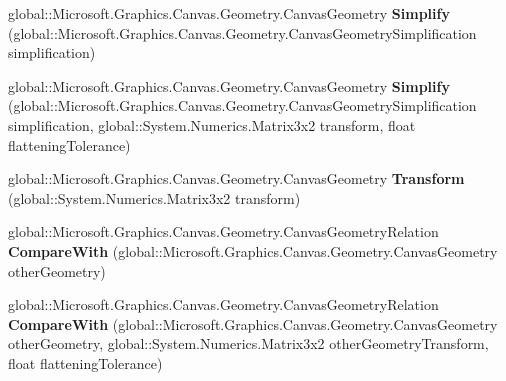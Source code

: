 \begin{DoxyCompactItemize}
global\+::\+Microsoft.\+Graphics.\+Canvas.\+Geometry.\+Canvas\+Geometry {\bfseries Simplify} (global\+::\+Microsoft.\+Graphics.\+Canvas.\+Geometry.\+Canvas\+Geometry\+Simplification simplification)
\item 
\mbox{\label{interface_microsoft_1_1_graphics_1_1_canvas_1_1_geometry_1_1_i_canvas_geometry_a4b3fad1c94d6807ac4628caa31ddcdfa}} 
global\+::\+Microsoft.\+Graphics.\+Canvas.\+Geometry.\+Canvas\+Geometry {\bfseries Simplify} (global\+::\+Microsoft.\+Graphics.\+Canvas.\+Geometry.\+Canvas\+Geometry\+Simplification simplification, global\+::\+System.\+Numerics.\+Matrix3x2 transform, float flattening\+Tolerance)
\item 
\mbox{\label{interface_microsoft_1_1_graphics_1_1_canvas_1_1_geometry_1_1_i_canvas_geometry_ac5c73fa815ab9daab0120a273c2a9f7a}} 
global\+::\+Microsoft.\+Graphics.\+Canvas.\+Geometry.\+Canvas\+Geometry {\bfseries Transform} (global\+::\+System.\+Numerics.\+Matrix3x2 transform)
\item 
\mbox{\label{interface_microsoft_1_1_graphics_1_1_canvas_1_1_geometry_1_1_i_canvas_geometry_a2ccaa7f710d287e5e4dd8170deb5f559}} 
global\+::\+Microsoft.\+Graphics.\+Canvas.\+Geometry.\+Canvas\+Geometry\+Relation {\bfseries Compare\+With} (global\+::\+Microsoft.\+Graphics.\+Canvas.\+Geometry.\+Canvas\+Geometry other\+Geometry)
\item 
\mbox{\label{interface_microsoft_1_1_graphics_1_1_canvas_1_1_geometry_1_1_i_canvas_geometry_a05b0590f7526c5e62b664f3c73b3f28e}} 
global\+::\+Microsoft.\+Graphics.\+Canvas.\+Geometry.\+Canvas\+Geometry\+Relation {\bfseries Compare\+With} (global\+::\+Microsoft.\+Graphics.\+Canvas.\+Geometry.\+Canvas\+Geometry other\+Geometry, global\+::\+System.\+Numerics.\+Matrix3x2 other\+Geometry\+Transform, float flattening\+Tolerance)
\item 
\mbox{\label{interface_microsoft_1_1_graphics_1_1_canvas_1_1_geometry_1_1_i_canvas_geometry_a0f5c0e7cc934073f79ef8689581c700e}} 

\end{DoxyCompactItemize}
